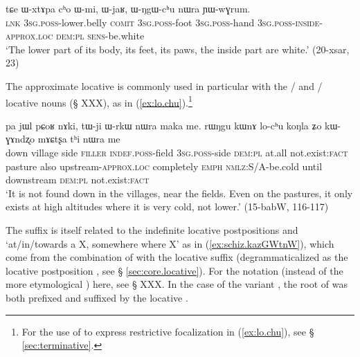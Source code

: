    \begin{exe}
\ex \label{ex:WNgW.chu}
 \gll tɕe ɯ-xtɤpa cʰo ɯ-mi, ɯ-jaʁ, ɯ-ŋgɯ-cʰu nɯra ɲɯ-wɣrum. \\
\textsc{lnk} \textsc{3sg}.\textsc{poss}-lower.belly \textsc{comit}  \textsc{3sg}.\textsc{poss}-foot  \textsc{3sg}.\textsc{poss}-hand  \textsc{3sg}.\textsc{poss}-\textsc{inside}-\textsc{approx}.\textsc{loc} \textsc{dem}:\textsc{pl}  \textsc{sens}-be.white \\
\glt `The lower part of its body, its feet, its paws, the inside part are white.' (20-xsar, 23)
    \end{exe}

The approximate locative  is commonly used in particular with the  /  and  /  locative nouns (§ XXX), as in (\ref{ex:lo.chu}).\footnote{For the use of  to express restrictive focalization in (\ref{ex:lo.chu}), see § \ref{sec:terminative}. }

\begin{exe}
\ex \label{ex:lo.chu}
 \gll  pa jɯl pɕoʁ nɤki, tɯ-ji ɯ-rkɯ nɯra maka me. rɯŋgu kɯnɤ lo-cʰu koŋla ʑo kɯ-ɣɤndʐo mɤɕtʂa tʰi nɯra me \\
 down village side \textsc{filler} \textsc{indef}.\textsc{poss}-field \textsc{3sg}.\textsc{poss}-side \textsc{dem}:\textsc{pl} at.all not.exist:\textsc{fact} pasture also upstream-\textsc{approx}.\textsc{loc} completely \textsc{emph} \textsc{nmlz}:S/A-be.cold until downstream \textsc{dem}:\textsc{pl} not.exist:\textsc{fact} \\
\glt  `It is not found down in the villages, near the fields. Even on the pastures, it only exists at high altitudes where it is very cold, not lower.' (15-babW, 116-117)
\end{exe}
 
The suffix  is itself related to the indefinite locative postpositions  and  `at/in/towards a X, somewhere where X' as in (\ref{ex:schiz.kazGWtnW}), which come from the combination of  with the locative suffix  (degrammaticalized as the locative postposition , see § \ref{sec:core.locative}). For the notation  (instead of the more etymological ) here, see § XXX. In the case of the variant , the root of  was both prefixed and suffixed by the locative .

